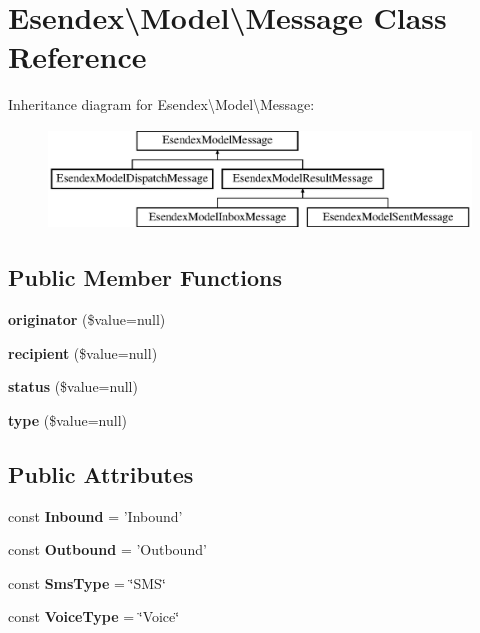 \section{Esendex\textbackslash{}Model\textbackslash{}Message Class Reference}
\label{class_esendex_1_1_model_1_1_message}
Inheritance diagram for Esendex\textbackslash{}Model\textbackslash{}Message\-:\begin{figure}[H]
\begin{center}
\leavevmode
\includegraphics[height=2.654028cm]{class_esendex_1_1_model_1_1_message}
\end{center}
\end{figure}
\subsection*{Public Member Functions}
\begin{DoxyCompactItemize}
\item 
{\bf originator} (\$value=null)
\item 
{\bf recipient} (\$value=null)
\item 
{\bf status} (\$value=null)
\item 
{\bf type} (\$value=null)
\end{DoxyCompactItemize}
\subsection*{Public Attributes}
\begin{DoxyCompactItemize}
\item 
const {\bfseries Inbound} = 'Inbound'\label{class_esendex_1_1_model_1_1_message_a5db54ef21255c6255063e052950e8324}

\item 
const {\bfseries Outbound} = 'Outbound'\label{class_esendex_1_1_model_1_1_message_ae522036ab44297d4682c3a045aefa356}

\item 
const {\bfseries Sms\-Type} = \char`\"{}S\-M\-S\char`\"{}\label{class_esendex_1_1_model_1_1_message_a0a4d140092d1806b1f173a39bbcafa4d}

\item 
const {\bfseries Voice\-Type} = \char`\"{}Voice\char`\"{}\label{class_esendex_1_1_model_1_1_message_ab36a9ed6648e01c8757e4beb465bdec6}

\end{DoxyCompactItemize}


